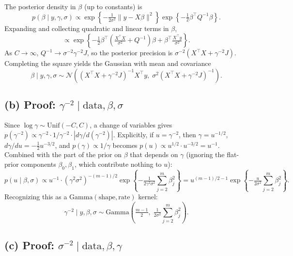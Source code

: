 \documentclass[
  letterpaper,
  DIV=11,
  numbers=noendperiod]{scrartcl}
\begin{document}
The posterior density in \(\beta\) (up to constants) is \[
p(\beta \mid y, \gamma, \sigma) \propto \exp\!\left\{-\tfrac{1}{2\sigma^2}\|y - X\beta\|^2\right\} \exp\!\left\{-\tfrac{1}{2}\beta^\top Q^{-1}\beta\right\}.
\] Expanding and collecting quadratic and linear terms in \(\beta\), \[
\propto \exp\!\left\{-\tfrac{1}{2}\beta^\top\!\left(\tfrac{X^\top X}{\sigma^2} + Q^{-1}\right)\beta + \beta^\top \tfrac{X^\top y}{\sigma^2}\right\}.
\] As \(C \to \infty\), \(Q^{-1} \to \sigma^{-2}\gamma^{-2} J\), so the
posterior precision is \(\sigma^{-2}(X^\top X + \gamma^{-2} J)\).
Completing the square yields the Gaussian with mean and covariance \[
\boxed{\beta \mid y,\gamma,\sigma \sim \mathcal{N}\!\left((X^\top X + \gamma^{-2} J)^{-1} X^\top y,\; \sigma^2 (X^\top X + \gamma^{-2} J)^{-1}\right).}
\]

\subsection{\texorpdfstring{(b) Proof:
\(\gamma^{-2} \mid \text{data}, \beta, \sigma\)}{(b) Proof: \textbackslash gamma\^{}\{-2\} \textbackslash mid \textbackslash text\{data\}, \textbackslash beta, \textbackslash sigma}}\label{b-proof-gamma-2-mid-textdata-beta-sigma}

Since \(\log \gamma \sim \text{Unif}(-C, C)\), a change of variables
gives
\(p(\gamma^{-2}) \propto \gamma^{-2} \cdot 1/\gamma^{-2} \cdot |d\gamma/d(\gamma^{-2})|\).
Explicitly, if \(u = \gamma^{-2}\), then \(\gamma = u^{-1/2}\),
\(d\gamma/du = -\tfrac{1}{2} u^{-3/2}\), and
\(p(\gamma) \propto 1/\gamma\) becomes
\(p(u) \propto u^{1/2} \cdot u^{-3/2} = u^{-1}\). Combined with the part
of the prior on \(\beta\) that depends on \(\gamma\) (ignoring the
flat-prior components \(\beta_0, \beta_1\), which contribute nothing to
\(u\)): \[
p(u \mid \beta, \sigma) \propto u^{-1} \cdot (\gamma^2\sigma^2)^{-(m-1)/2} \exp\!\left\{-\tfrac{1}{2\gamma^2\sigma^2}\sum_{j=2}^m \beta_j^2\right\} = u^{(m-1)/2 - 1} \exp\!\left\{-\tfrac{u}{2\sigma^2}\sum_{j=2}^m \beta_j^2\right\}.
\] Recognizing this as a \(\text{Gamma}(\text{shape}, \text{rate})\)
kernel: \[
\boxed{\gamma^{-2} \mid y, \beta, \sigma \sim \text{Gamma}\!\left(\tfrac{m-1}{2},\; \tfrac{1}{2\sigma^2}\sum_{j=2}^m \beta_j^2\right).}
\]

\subsection{\texorpdfstring{(c) Proof:
\(\sigma^{-2} \mid \text{data}, \beta, \gamma\)}{(c) Proof: \textbackslash sigma\^{}\{-2\} \textbackslash mid \textbackslash text\{data\}, \textbackslash beta, \textbackslash gamma}}\label{c-proof-sigma-2-mid-textdata-beta-gamma}
\end{document}
